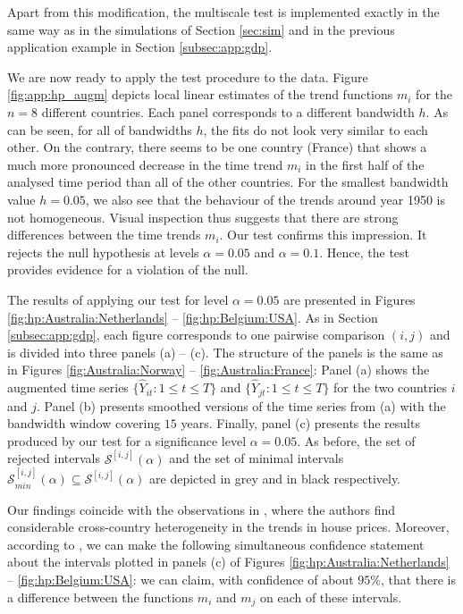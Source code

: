 \documentclass[a4paper,12pt]{article}
\makeatletter
\renewcommand{\eqref}[1]{\tagform@{\ref{#1}}}
\makeatother
\begin{document}
Apart from this modification, the multiscale test is implemented exactly in the same way as in the simulations of Section \ref{sec:sim} and in the previous application example in Section \ref{subsec:app:gdp}. 

We are now ready to apply the test procedure to the data. Figure \ref{fig:app:hp_augm} depicts local linear estimates of the trend functions $m_i$ for the $n=8$ different countries. Each panel corresponds to a different bandwidth $h$. As can be seen, for all of bandwidths $h$, the fits do not look very similar to each other. On the contrary, there seems to be one country (France) that shows a much more pronounced decrease in the time trend $m_i$ in the first half of the analysed time period than all of the other countries. For the smallest bandwidth value $h = 0.05$, we also see that the behaviour of the trends around year 1950 is not homogeneous. Visual inspection thus suggests that there are strong differences between the time trends $m_i$. Our test confirms this impression. It rejects the null hypothesis at levels $\alpha = 0.05$ and $\alpha = 0.1$. Hence, the test provides evidence for a violation of the null. 

The results of applying our test for level $\alpha= 0.05$ are presented in Figures \ref{fig:hp:Australia:Netherlands} -- \ref{fig:hp:Belgium:USA}. As in Section \ref{subsec:app:gdp}, each figure corresponds to one pairwise comparison $(i, j)$ and is divided into three panels (a) -- (c). The structure of the panels is the same as in Figures \ref{fig:Australia:Norway} -- \ref{fig:Australia:France}: Panel (a) shows the augmented time series $\{\widehat{Y}_{it}: 1 \le t \le T\}$ and $\{\widehat{Y}_{jt}: 1 \le t \le T\}$ for the two countries $i$ and $j$. Panel (b) presents smoothed versions of the time series from (a) with the bandwidth window covering $15$ years. Finally, panel (c) presents the results produced by our test for a significance level $\alpha = 0.05$. As before, the set of rejected intervals $\mathcal{S}^{[i, j]}(\alpha)$ and the set of minimal intervals $\mathcal{S}^{[i, j]}_{min}(\alpha) \subseteq \mathcal{S}^{[i, j]}(\alpha)$ are depicted in grey and in black respectively. 

Our findings coincide with the observations in \cite{Knoll2017}, where the authors find considerable cross-country heterogeneity in the trends in house prices. Moreover, according to \eqref{corollary1}, we can make the following simultaneous confidence statement about the intervals plotted in panels (c) of Figures \ref{fig:hp:Australia:Netherlands} -- \ref{fig:hp:Belgium:USA}: we can claim, with confidence of about $95\%$, that there is a difference between the functions $m_i$ and $m_j$ on each of these intervals. 
\end{document}
